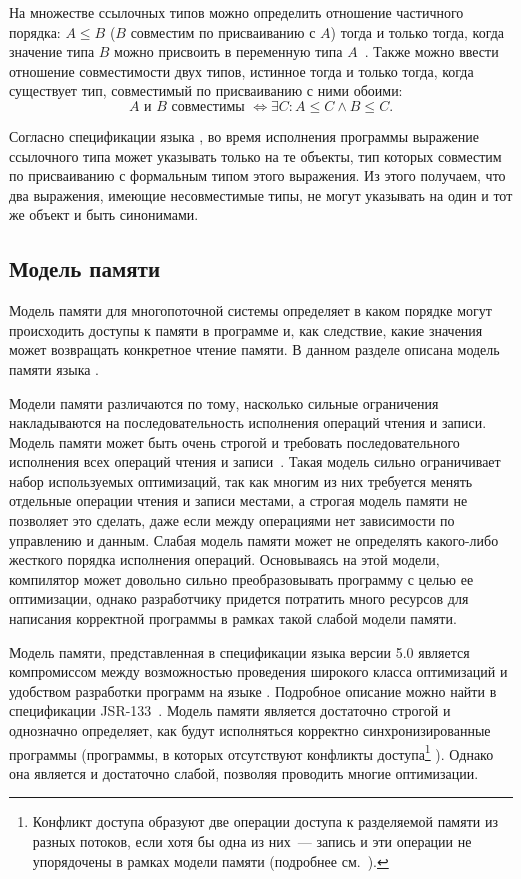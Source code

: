 \documentclass[14pt,titlepage,draft]{extarticle}
\newcommand{\java}{\eng{Java}\xspace}
\begin{document}
    На множестве ссылочных типов можно определить отношение частичного
    порядка: $A \leq B$ ($B$ совместим по присваиванию с $A$) тогда и только
    тогда, когда значение типа $B$ можно присвоить
    в переменную типа $A$~\cite{nastia_type_analysis}.
    Также можно ввести отношение совместимости двух типов, истинное тогда и
    только тогда, когда существует тип, совместимый по присваиванию с ними
    обоими:
    \[
      A \text{ и } B \text{ совместимы }
      \Leftrightarrow
      \exists C\colon A \leq C \land B \leq C.
    \]

    Согласно спецификации языка \java, во время исполнения программы
    выражение ссылочного типа может указывать только на те объекты, тип
    которых совместим по присваиванию с формальным типом этого выражения.
    Из этого получаем, что два выражения, имеющие несовместимые типы, не
    могут указывать на один и тот же объект и быть синонимами.

  \subsection{Модель памяти}

    Модель памяти для многопоточной системы определяет в каком
    порядке могут происходить доступы к памяти в программе и, как следствие,
    какие значения может возвращать конкретное чтение памяти. В данном разделе
    описана модель памяти языка \java.

    Модели памяти различаются по тому, насколько сильные ограничения
    накладываются на последовательность исполнения операций чтения и записи.
    Модель памяти может быть очень строгой и требовать последовательного
    исполнения всех операций чтения и записи~\cite{lamport}.
    Такая модель сильно ограничивает набор используемых оптимизаций, так как
    многим из них требуется менять отдельные операции чтения и записи местами,
    а строгая модель памяти не позволяет это сделать, даже если между
    операциями нет зависимости по управлению и данным.
    Слабая модель памяти может не определять какого-либо жесткого порядка
    исполнения операций. Основываясь на этой модели, компилятор может довольно
    сильно преобразовывать программу с целью ее оптимизации, однако
    разработчику придется потратить много ресурсов для написания корректной
    программы в рамках такой слабой модели памяти.

    Модель памяти, представленная в спецификации языка \java версии 5.0
    является компромиссом между возможностью проведения широкого класса
    оптимизаций и удобством разработки программ на языке \java. Подробное
    описание можно найти в спецификации JSR-133~\cite{jsr133}. Модель памяти
    является достаточно строгой и однозначно определяет, как будут исполняться
    корректно синхронизированные программы (программы, в которых отсутствуют
    конфликты доступа\footnote{
      Конфликт доступа  образуют две операции доступа к
      разделяемой памяти из разных потоков, если хотя бы одна из них~---
      запись и эти операции не упорядочены в рамках модели памяти (подробнее
      см.~\cite[раздел~2.1]{manson_jmm}).
    } ). Однако она является и достаточно слабой,
    позволяя проводить многие оптимизации.
\end{document}
